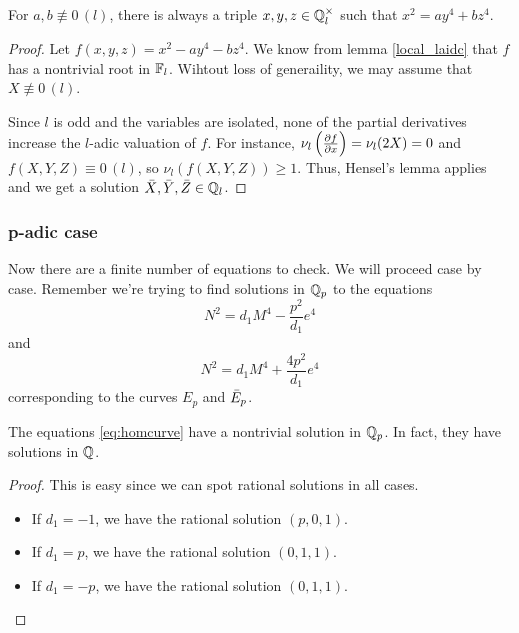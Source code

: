 \documentclass[12pt, a4paper]{amsart}
\begin{document}
\begin{thm}
  For $a, b \not\equiv 0 \, (l)$, there is always a triple
  $x, y, z \in {\mathbb Q}_l^{\times}$ such that $x^2 = ay^4 + bz^4$.
\end{thm}
\begin{proof}
  Let $f(x,y,z) = x^2 - ay^4 - bz^4$. We know from lemma \autoref{local_laidc}
  that $f$ has a nontrivial root in $\mathbb{F}_l$. Wihtout loss of generaility,
  we may assume that $X \not\equiv 0 \, (l)$.

  Since $l$ is odd and the variables are isolated,
  none of the partial derivatives increase the $l$-adic valuation
  of $f$. For instance, $\nu_l \left( \frac{\partial f}{\partial x} \right)=
  \nu_l(2X) = 0$ and $f(X,Y,Z) \equiv 0 \, (l)$, so $\nu_l(f(X,Y,Z)) \geq 1$.
  Thus, Hensel's lemma applies and we get a solution $\bar{X}, \bar{Y}, \bar{Z}
  \in {\mathbb Q}_l$. 
\end{proof}
  
\subsubsection{p-adic case}
Now there are a finite number of equations to check. We will proceed case by
case. Remember we're trying to find solutions in ${\mathbb Q}_p$ to the equations
\begin{equation} \label{eq:homcurve}
  N^2 = d_1 M^4 - \frac{p^2}{d_1}e^4
\end{equation}
and
\begin{equation} \label{eq:isocurve}
  N^2 = d_1 M^4 + \frac{4p^2}{d_1}e^4
\end{equation}
corresponding to the curves $E_p$ and $\bar{E}_p$.

\begin{thm}
  The equations \ref{eq:homcurve} have a nontrivial solution in ${\mathbb Q}_p$. In fact,
  they have solutions in ${\mathbb Q}$.
\end{thm}
\begin{proof} This is easy since we can spot rational solutions in all cases.
   
  \begin{itemize}
  \item If $d_1 = -1$, we have the rational solution $(p, 0, 1)$.
  \item If $d_1 = p$, we have the rational solution $(0, 1, 1)$.
  \item If $d_1 = -p$, we have the rational solution $(0, 1, 1)$.
  \end{itemize}
\end{proof}
\end{document}
